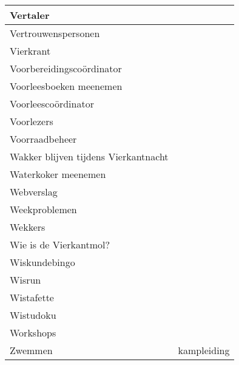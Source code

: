 \documentclass{takenlijst}
\begin{document}
\begin{center}
\begin{small}
\begin{tabular}{|l|l|}
\hline
Vertaler & \\
\hline
Vertrouwenspersonen & \\
\hline
Vierkrant & \\
\hline
Voorbereidingsco\"ordinator & \\
\hline
Voorleesboeken meenemen & \\
\hline
Voorleesco\"ordinator & \\
\hline
Voorlezers & \\
\hline
Voorraadbeheer & \\
\hline
Wakker blijven tijdens Vierkantnacht & \\
\hline
Waterkoker meenemen & \\
\hline
Webverslag & \\
\hline
Weekproblemen & \\
\hline
Wekkers & \\
\hline
Wie is de Vierkantmol? & \\
\hline
Wiskundebingo & \\
\hline
Wisrun & \\
\hline
Wistafette & \\
\hline
Wistudoku & \\
\hline
Workshops & \\
\hline
Zwemmen & kampleiding \\
\hline
\end{tabular}
\end{small}
\end{center}
\end{document}
